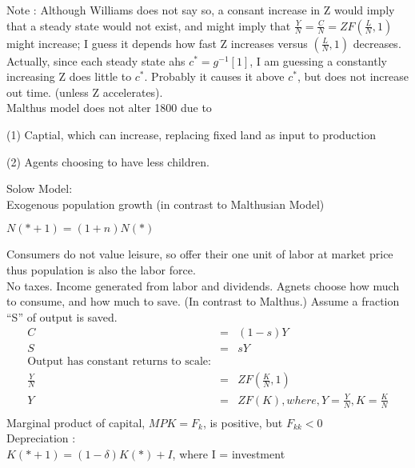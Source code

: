Note : Although Williams does not say so, a consant increase in Z would imply that a steady state would not exist, and might imply that $\frac{Y}{N} = \frac{C}{N} = ZF\left( \frac{L}{N}, 1\right)$ might increase; I guess it depends how fast Z increases versus $\left( \frac{L}{N}, 1\right)$ decreases. Actually, since each steady state ahs $c^* = g^{-1} [1]$, I am guessing a constantly increasing Z does little to $c^*$. Probably it causes it above $c^*$, but does not increase out time. (unless Z accelerates).\\

Malthus model does not alter 1800 due to \\
\begin{list}{ }{}
\item (1) Captial, which can increase, replacing fixed land as input to production
\item (2) Agents choosing to have less children.
\end{list}

Solow Model:\\
Exogenous population growth (in contrast to Malthusian Model)
\begin{center}
$N(*+1) = (1+n) N(*)$\\
\end{center}

Consumers do not value leisure, so offer their one unit of labor at market price thus population is also the labor force.\\

No taxes. Income generated from labor and dividends. Agnets choose how much to consume, and how much to save. (In contrast to Malthus.) Assume a fraction ``S'' of output is saved.\\
\begin{eqnarray*}
C &=& (1-s)Y\\
S &=& s Y\\
\mbox{Output has constant returns to scale:}\\
\frac{Y}{N} &=& ZF\left( \frac{K}{N}, 1\right)\\
Y &=& ZF(K), where, Y = \frac{Y}{N}, K = \frac{K}{N}\\
\end{eqnarray*}
Marginal product of capital, $MPK = F_k$, is positive, but $F_{kk}<0$ \\

Depreciation : \\
$K(*+1) = (1-\delta) K(*) + I$, where I = investment\\

